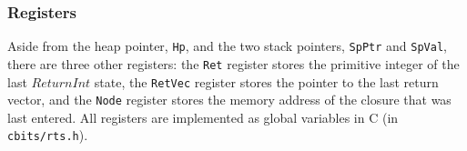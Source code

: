 \subsubsection{Registers}
\label{app:registers}

Aside from the heap pointer, \texttt{Hp}, and the two stack pointers, \texttt{SpPtr} and \texttt{SpVal}, there are three other registers: the \texttt{Ret} register stores the primitive integer of the last $\mathit{ReturnInt}$ state, the \texttt{RetVec} register stores the pointer to the last return vector, and the \texttt{Node} register stores the memory address of the closure that was last entered. All registers are implemented as global variables in C (in \texttt{cbits/rts.h}).